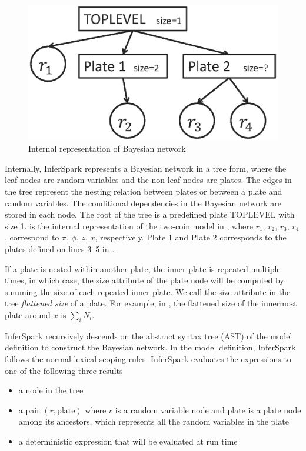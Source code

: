 \begin{figure}[ht]
\centering
	\includegraphics[width=0.6\columnwidth]{figs/two_coins_internal_bn1.eps}
	\caption{Internal representation of Bayesian network}
	\label{fig:two_coins_internal_bn1}
\end{figure}

Internally, InferSpark represents a Bayesian network in a tree form, where the
leaf nodes are random variables and the non-leaf nodes are plates. The edges
in the tree represent the nesting relation between plates or between a plate
and random variables. The conditional dependencies in the Bayesian network are
stored in each node.  The root of the tree is a predefined plate TOPLEVEL with
size 1.   is the internal representation of
the two-coin model in , where
$r_1$, $r_2$, $r_3$, $r_4$, correspond to $\pi$, $\phi$, $z$, $x$, respectively. 
Plate 1 and Plate 2 corresponds to the plates defined on lines 3--5 in
. 

If a plate is nested within another plate,
the inner plate is repeated multiple times, in which case,
the size attribute of the plate node will be computed by summing the size of each
repeated inner plate. We call the size attribute in the tree {\em flattened size}
of a plate. For example, in , the flattened
size of the innermost plate around $x$ is $\sum_i N_i$.


InferSpark recursively descends on the abstract syntax tree (AST) of the model definition to construct
the Bayesian network.   In the
model definition, InferSpark follows the normal lexical scoping rules.
InferSpark evaluates the expressions to one of the following three results
\begin{itemize}
	\item a node in the tree
	\item a pair $(r, \textrm{plate})$ where $r$ is a random variable node
		and plate is a plate node among its ancestors, which represents all
		the random variables in the plate
	\item a deterministic expression that will be evaluated at run time
\end{itemize}

